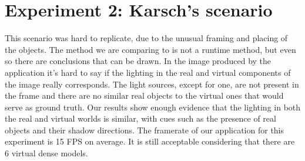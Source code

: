 \section{Experiment 2: Karsch's scenario }
This scenario was hard to replicate, due to the unusual framing and placing of the objects. The method we are comparing to is not a runtime method, but even so there are conclusions that can be drawn. In the image produced by the \citet{karsh2014} application it's hard to say if the lighting in the real and virtual components of the image really corresponds. The light sources, except for one, are not present in the frame and there are no similar real objects to the virtual ones that would serve as ground truth. Our results show enough evidence that the lighting in both the real and virtual worlds is similar, with cues such as the presence of real objects and their shadow directions.\newline
The framerate of our application for this experiment is 15 FPS on average. It is still acceptable considering that there are 6 virtual dense models.
